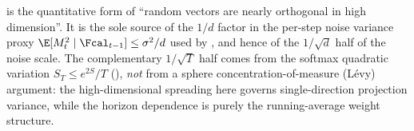 \begin{remark}
\label{rem:orthogonality_structural}
 is the quantitative form of ``random
vectors are nearly orthogonal in high dimension''. It is the sole source
of the $1/d$ factor in the per-step noise variance proxy
$\E[M_t^2\mid\Fcal_{t-1}]\le\sigma^2/d$ used by , and
hence of the $1/\sqrt d$ half of the noise scale. The complementary
$1/\sqrt{T}$ half comes from the softmax quadratic variation
$S_T\le e^{2S}/T$ (), \emph{not} from a
sphere concentration-of-measure (L\'evy) argument: the high-dimensional
spreading here governs single-direction projection variance, while the
horizon dependence is purely the running-average weight structure.
\end{remark}
